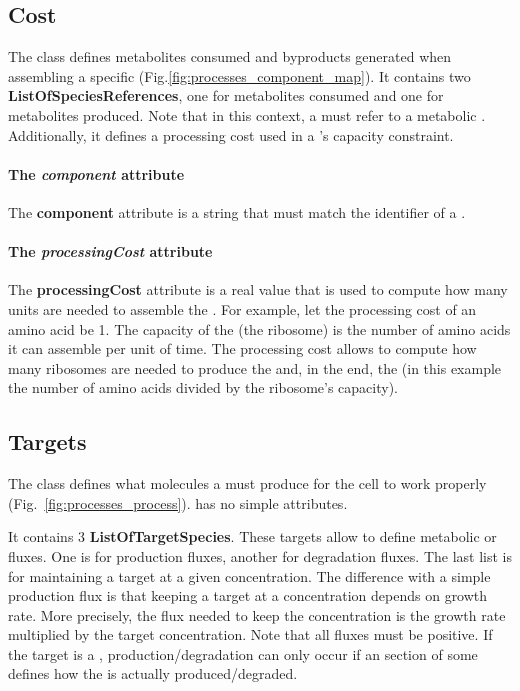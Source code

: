 \subsection{Cost}
\label{sec:cost}

The \cost{} class defines metabolites consumed and byproducts
generated when assembling a specific \component{}
(Fig.\ref{fig:processes_component_map}).
It contains two \textbf{ListOfSpeciesReferences}, one for metabolites
consumed and one for metabolites produced.
Note that in this context, a \speciesreference{} must refer to a
metabolic \species.
Additionally, it defines a processing cost used in a \machinery{}'s
capacity constraint.

\paragraph{The \textit{component} attribute}
The \textbf{component} attribute is a string that must match the identifier
of a \component{}.

\paragraph{The \textit{processingCost} attribute}
The \textbf{processingCost} attribute is a real value that is used to
compute how many \machinery{} units are needed to assemble the \component{}.
For example, let the processing cost of an amino acid be 1.
The capacity of the \machinery{} (the ribosome) is the number of amino acids
it can assemble per unit of time.
The processing cost allows to compute how many ribosomes are needed
to produce the \component{} and, in the end, the \macromolecule{}
(in this example the number of amino acids divided by the ribosome's capacity).


\subsection{Targets}
\label{sec:targets}

The \targets{} class defines what molecules a \process{} must produce for
the cell to work properly (Fig.~\ref{fig:processes_process}).
\targets{} has no simple attributes.

It contains 3 \textbf{ListOfTargetSpecies}.
These targets allow to define metabolic \species{} or \macromolecule{} fluxes.
One is for production fluxes, another for degradation fluxes.
The last list is for maintaining a target at a given concentration.
The difference with a simple production flux is that keeping a target at a
concentration depends on growth rate.
More precisely, the flux needed to keep the concentration is
the growth rate multiplied by the target concentration.
Note that all fluxes must be positive.
If the target is a \macromolecule, production/degradation can only occur
if an \operations{} section of some \process{} defines how the \macromolecule{}
is actually produced/degraded.

